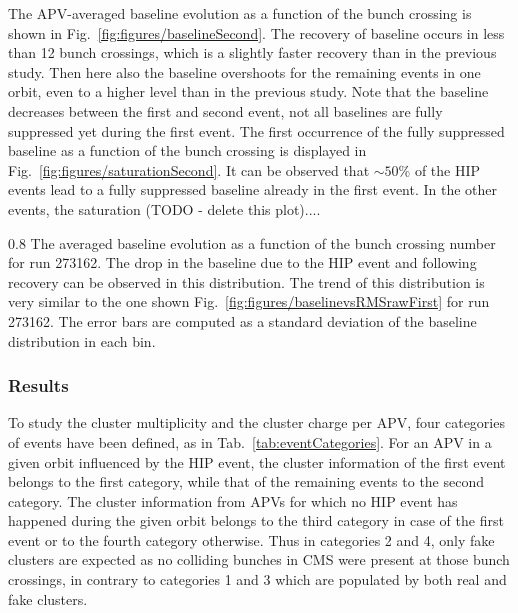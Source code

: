 The APV-averaged baseline evolution as a function of the bunch crossing is shown in Fig.~\ref{fig:figures/baselineSecond}. The recovery of baseline occurs in less than 12 bunch crossings, which is a slightly faster recovery than in the previous study. Then here also the baseline overshoots for the remaining events in one orbit, even to a higher level than in the previous study. Note that the baseline decreases between the first and second event, not all baselines are fully suppressed yet during the first event. The first occurrence of the fully suppressed baseline as a function of the bunch crossing is displayed in Fig.~\ref{fig:figures/saturationSecond}. It can be observed that $\sim 50\%$ of the HIP events lead to a fully suppressed baseline already in the first event. In the other events, the saturation (TODO - delete this plot)....

                 {0.8}       %
                 {The averaged baseline evolution as a function of the bunch crossing number for run 273162. The drop in the baseline due to the HIP event and following recovery can be observed in this distribution. The trend of this distribution is very similar to the one shown Fig.~\ref{fig:figures/baselinevsRMSrawFirst} for run 273162. The error bars are computed as a standard deviation of the baseline distribution in each bin.  } %
 

\subsubsection{Results}

To study the cluster multiplicity and the cluster charge per APV, four categories of events have been defined, as in Tab.~\ref{tab:eventCategories}. For an APV in a given orbit influenced by the HIP event, the cluster information of the first event belongs to the first category, while that of the remaining events to the second category. The cluster information from APVs for which no HIP event has happened during the given orbit belongs to the third category in case of the first event or to the fourth category otherwise. Thus in categories 2 and 4, only fake clusters are expected as no colliding bunches in CMS were present at those bunch crossings, in contrary to categories 1 and 3 which are populated by both real and fake clusters.

